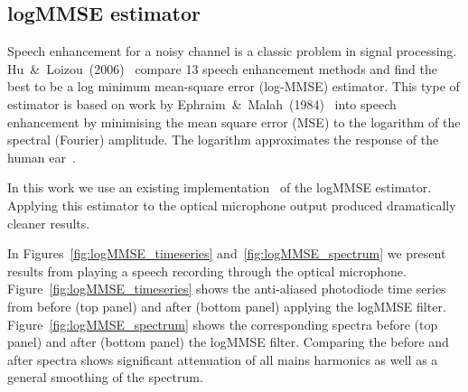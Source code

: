\documentclass[paper-main.tex]{subfiles}
\begin{document}



\subsection{logMMSE estimator}
\label{sec:logmmse}

Speech enhancement for a noisy channel is a classic problem in signal processing. 
Hu~\&~Loizou~(2006)~\cite{SubjectiveComparison} compare 13 speech enhancement methods and find the best to be a log minimum mean-square error (log-MMSE) estimator. 
This type of estimator is based on work by Ephraim~\&~Malah~(1984)~\cite{Ephraim1984SpeechEU_logMMSE} into speech enhancement by minimising the mean square error (MSE) to the logarithm of the spectral (Fourier) amplitude.
The logarithm approximates the response of the human ear~\cite{SubjectiveComparison}.


In this work we use an existing implementation~\cite{logmmse} of the logMMSE estimator. 
Applying this estimator to the optical microphone output produced dramatically cleaner results. 

In Figures~\ref{fig:logMMSE_timeseries} and~\ref{fig:logMMSE_spectrum} we present results from playing a speech recording through the optical microphone. 
Figure~\ref{fig:logMMSE_timeseries} shows the anti-aliased photodiode time series from before (top panel) and after (bottom panel) applying the logMMSE filter. 
Figure~\ref{fig:logMMSE_spectrum} shows the corresponding spectra before (top panel) and after (bottom panel) the logMMSE filter. 
Comparing the before and after spectra shows significant attenuation of all mains harmonics as well as a general smoothing of the spectrum. 
\end{document}
